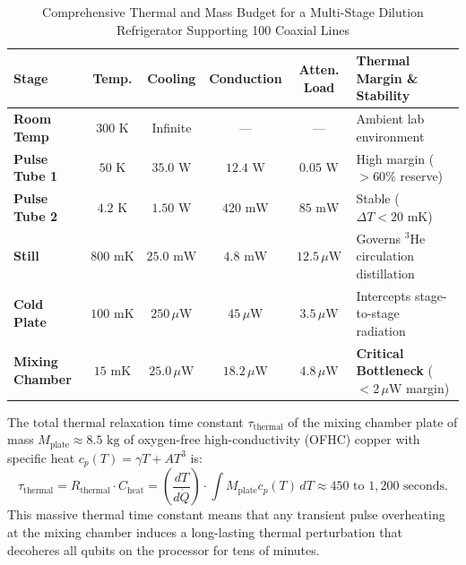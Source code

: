 \begin{table}[htbp]
\centering
\small
\caption{Comprehensive Thermal and Mass Budget for a Multi-Stage Dilution Refrigerator Supporting 100 Coaxial Lines}
\label{tab:dilution_multistage_budget}
\begin{tabularx}{\textwidth}{p{2.4cm} c c c c X}
\toprule
\textbf{Stage} & \textbf{Temp.} & \textbf{Cooling} & \textbf{Conduction} & \textbf{Atten. Load} & \textbf{Thermal Margin \& Stability} \\
\midrule
\textbf{Room Temp} & $300\text{ K}$ & Infinite & --- & --- & Ambient lab environment \\
\textbf{Pulse Tube 1} & $50\text{ K}$ & $35.0\text{ W}$ & $12.4\text{ W}$ & $0.05\text{ W}$ & High margin ($>60\%$ reserve) \\
\textbf{Pulse Tube 2} & $4.2\text{ K}$ & $1.50\text{ W}$ & $420\text{ mW}$ & $85\text{ mW}$ & Stable ($\Delta T < 20\text{ mK}$) \\
\textbf{Still} & $800\text{ mK}$ & $25.0\text{ mW}$ & $4.8\text{ mW}$ & $12.5\,\mu\text{W}$ & Governs $^3\text{He}$ circulation distillation \\
\textbf{Cold Plate} & $100\text{ mK}$ & $250\,\mu\text{W}$ & $45\,\mu\text{W}$ & $3.5\,\mu\text{W}$ & Intercepts stage-to-stage radiation \\
\textbf{Mixing Chamber} & $15\text{ mK}$ & $25.0\,\mu\text{W}$ & $18.2\,\mu\text{W}$ & $4.8\,\mu\text{W}$ & \textbf{Critical Bottleneck} ($<2\,\mu\text{W}$ margin) \\
\bottomrule
\end{tabularx}
\end{table}

The total thermal relaxation time constant $\tau_{\text{thermal}}$ of the mixing chamber plate of mass $M_{\text{plate}} \approx 8.5\text{ kg}$ of oxygen-free high-conductivity (OFHC) copper with specific heat $c_p(T) = \gamma T + A T^3$ is:
\begin{equation}
    \tau_{\text{thermal}} = R_{\text{thermal}} \cdot C_{\text{heat}} = \left( \frac{dT}{d\dot{Q}} \right) \cdot \int M_{\text{plate}} c_p(T)\,dT \approx 450\text{ to }1{,}200\text{ seconds}.
\end{equation}
This massive thermal time constant means that any transient pulse overheating at the mixing chamber induces a long-lasting thermal perturbation that decoheres all qubits on the processor for tens of minutes.

